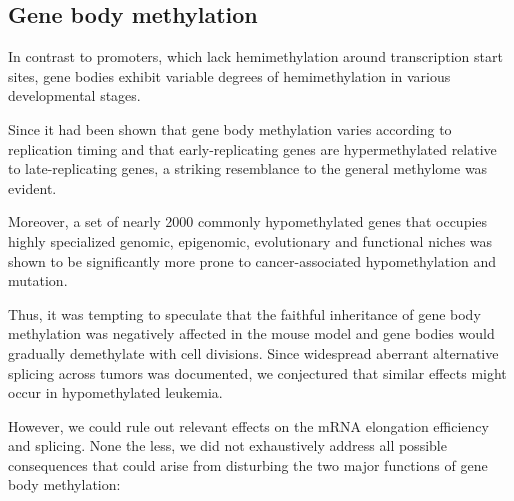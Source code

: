 \subsection{Gene body methylation}
\label{chap:d:methylation:persistentregions:genebodies}

In contrast to promoters, which lack hemimethylation around transcription start sites, gene bodies exhibit variable degrees of hemimethylation in various developmental stages\cite{Xu2018b}. 

Since it had been shown that gene body methylation varies according to replication timing and that early-replicating genes are hypermethylated relative to late-replicating genes\cite{Aran2011}, a striking resemblance to the general \dnmtchip methylome was evident. 

Moreover, a set of nearly \num{2000} commonly hypomethylated genes that occupies highly specialized genomic, epigenomic, evolutionary and functional niches was shown to be significantly more prone to cancer-associated hypomethylation and mutation\cite{Mendizabal2017}. 

Thus, it was tempting to speculate that the faithful inheritance of gene body methylation was negatively affected in the \dnmtchip mouse model and gene bodies would gradually demethylate with cell divisions. Since widespread aberrant alternative splicing across tumors was documented\cite{Kahles2018}, we conjectured that similar effects might occur in hypomethylated leukemia. 

However, we could rule out relevant effects on the mRNA elongation efficiency and splicing. None the less, we did not exhaustively address all possible consequences that could arise from disturbing the two major functions of gene body methylation:

